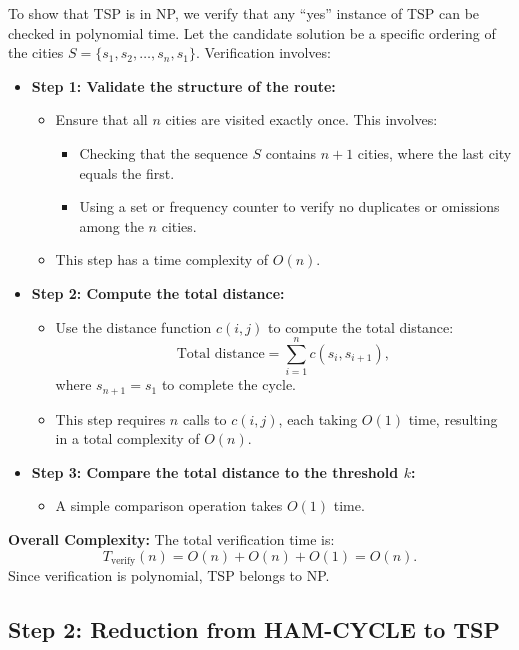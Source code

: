 \documentclass[12pt]{article}
\begin{document}
To show that TSP is in NP, we verify that any ``yes'' instance of TSP can be checked in polynomial time. Let the candidate solution be a specific ordering of the cities \(S = \{s_1, s_2, \ldots, s_n, s_1\}\). Verification involves:

\begin{itemize}
    \item \textbf{Step 1: Validate the structure of the route:}
    \begin{itemize}
        \item Ensure that all \(n\) cities are visited exactly once. This involves:
        \begin{itemize}
            \item Checking that the sequence \(S\) contains \(n+1\) cities, where the last city equals the first.
            \item Using a set or frequency counter to verify no duplicates or omissions among the \(n\) cities.
        \end{itemize}
        \item This step has a time complexity of \(O(n)\).
    \end{itemize}
    \item \textbf{Step 2: Compute the total distance:}
    \begin{itemize}
        \item Use the distance function \(c(i, j)\) to compute the total distance:
        \[
        \text{Total distance} = \sum_{i=1}^{n} c(s_i, s_{i+1}),
        \]
        where \(s_{n+1} = s_1\) to complete the cycle.
        \item This step requires \(n\) calls to \(c(i, j)\), each taking \(O(1)\) time, resulting in a total complexity of \(O(n)\).
    \end{itemize}
    \item \textbf{Step 3: Compare the total distance to the threshold \(k\):}
    \begin{itemize}
        \item A simple comparison operation takes \(O(1)\) time.
    \end{itemize}
\end{itemize}

\textbf{Overall Complexity:}
The total verification time is:
\[
T_{\text{verify}}(n) = O(n) + O(n) + O(1) = O(n).
\]
Since verification is polynomial, TSP belongs to NP.

\subsection*{Step 2: Reduction from HAM-CYCLE to TSP}
\end{document}
